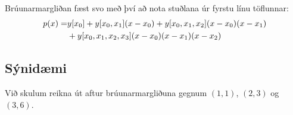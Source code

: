 \documentclass[letterpaper,10pt,icelandic]{sphinxmanual}
\begin{document}
Brúunarmargliðan fæst svo með því að nota stuðlana úr fyrstu línu
töflunnar:
\begin{gather}
\begin{split}\begin{aligned}
  p(x) = &y[x_0] + y[x_0,x_1](x-x_0)
  + y[x_0,x_1,x_2](x-x_0)(x-x_1) \\
  &+ y[x_0,x_1,x_2,x_3](x-x_0)(x-x_1)(x-x_2)\end{aligned}\end{split}\notag
\end{gather}

\subsection{Sýnidæmi}
\label{kafli03:id2}
Við skulum reikna út aftur brúunarmargliðuna gegnum \((1,1)\),
\((2,3)\) og \((3,6)\).
\end{document}
